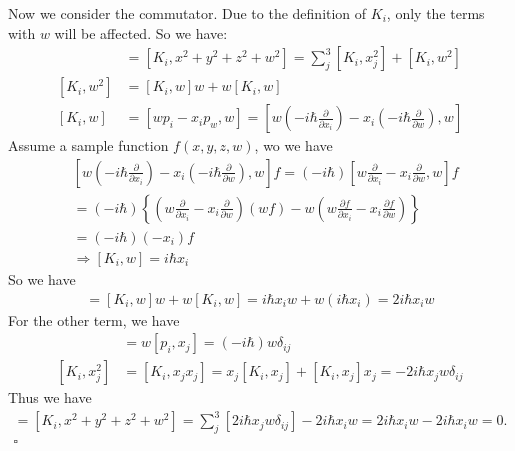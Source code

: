 \documentclass[../../main.tex]{subfiles}
\begin{document}
\begin{enumerate}
{{\begin{enumerate}
    Now we consider the commutator. Due to the definition of $K_{i}$, only the terms with $w$ will be affected. So we have:
    \begin{align*}
      [K_{i},R^{2}] &= [K_{i},x^{2} + y^{2} + z^{2} + w^{2}]= \sum_{j}^{3}[K_{i},x_{j}^{2}] + [K_{i},w^{2}]\\
      [K_{i},w^{2}] &= [K_{i},w]w + w[K_{i},w]\\
      [K_{i},w] &= [wp_{i} - x_{i}p_{w},w] = \left[w\left(-i\hbar\frac{\partial }{\partial x_{i}}\right)-x_{i}\left(-i\hbar\frac{\partial }{\partial w}\right),w\right]
    \end{align*}
    Assume a sample function $f(x,y,z,w)$, wo we have
    \begin{align*}
      &\left[w\left(-i\hbar\frac{\partial }{\partial x_{i}}\right)-x_{i}\left(-i\hbar\frac{\partial }{\partial w}\right),w\right]f = (-i\hbar)\left[w\frac{\partial }{\partial x_{i}} - x_{i}\frac{\partial }{\partial w},w\right]f\\
      &= (-i\hbar)\left\{\left(w\frac{\partial }{\partial x_{i}} - x_{i}\frac{\partial }{\partial w}\right)(wf) - w\left(w\frac{\partial f}{\partial x_{i}} - x_{i}\frac{\partial f}{\partial w}\right)\right\}\\
      &= (-i\hbar)(-x_{i})f\\
      &\Rightarrow \boxed{[K_{i},w] = i\hbar x_{i}}
    \end{align*}
    So we have
    \begin{align*}
      [K_{i},w^{2}] = [K_{i},w]w + w[K_{i},w] = i\hbar x_{i}w + w(i\hbar x_{i}) = 2i\hbar x_{i}w
    \end{align*}
    For the other term, we have
    \begin{align*}
      [K_{i},x_{j}] &= w[p_{i},x_{j}] =(-i\hbar)w\delta_{ij}\\
      [K_{i},x_{j}^{2}] &= [K_{i},x_{j}x_{j}] = x_{j}[K_{i},x_{j}] + [K_{i},x_{j}]x_{j} = -2i\hbar x_{j}w\delta_{ij}
    \end{align*}
    Thus we have
    \begin{align*}
      [K_{i},R^{2}] = [K_{i},x^{2} + y^{2} + z^{2} + w^{2}] = \sum_{j}^{3}\left[2i\hbar x_{j}w\delta_{ij}\right] - 2i\hbar x_{i}w = 2i\hbar x_{i}w - 2i\hbar x_{i}w = 0.\\\square
    \end{align*}
  \end{enumerate}}}


\end{enumerate}
\end{document}
